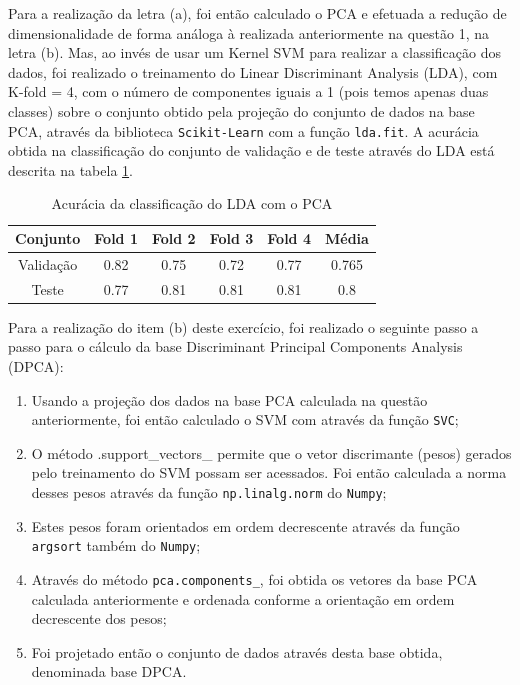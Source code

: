 \documentclass[]{abntex2}
\begin{document}
Para a realização da letra (a), foi então calculado o PCA e efetuada a redução de dimensionalidade de forma análoga à realizada anteriormente na questão 1, na letra (b). Mas, ao invés de usar um Kernel SVM para realizar a classificação dos dados, foi realizado o treinamento do Linear Discriminant Analysis (LDA), com K-fold = 4, com o número de componentes iguais a 1 (pois temos apenas duas classes) sobre o conjunto obtido pela projeção do conjunto de dados na base PCA, através da biblioteca \texttt{Scikit-Learn} com a função \texttt{lda.fit}. A acurácia obtida na classificação do conjunto de validação e de teste através do LDA está descrita na tabela \ref{tab:lda_clas}.

\begin{table}[H]
    \centering
    \begin{tabular}{|c|c|c|c|c|c|}
    \hline
    \rowcolor[HTML]{C0C0C0} 
    Conjunto                          & Fold 1 & Fold 2 & Fold 3 & Fold 4 & Média  \\ \hline
    \cellcolor[HTML]{C0C0C0}Validação & 0.82   & 0.75  & 0.72   & 0.77   & 0.765  \\ \hline
    \cellcolor[HTML]{C0C0C0}Teste     & 0.77   & 0.81   & 0.81   & 0.81   & 0.8 \\ \hline
    \end{tabular}
    \caption{Acurácia da classificação do LDA com o PCA}
    \label{tab:lda_clas}
\end{table}

Para a realização do item (b) deste exercício, foi realizado o seguinte passo a passo para o cálculo da base Discriminant Principal Components Analysis (DPCA):

\begin{enumerate}
    \item Usando a projeção dos dados na base PCA calculada na questão anteriormente, foi então calculado o SVM com através da função \texttt{SVC};
    \item O método {.support\_vectors\_} permite que o vetor discrimante (pesos) gerados pelo treinamento do SVM possam ser acessados. Foi então calculada a norma desses pesos através da função \texttt{np.linalg.norm} do \texttt{Numpy};
    \item Estes pesos foram orientados em ordem decrescente através da função \texttt{argsort} também do \texttt{Numpy};
    \item Através do método \texttt{pca.components\_}, foi obtida os vetores da base PCA calculada anteriormente e ordenada conforme a orientação em ordem decrescente dos pesos;
    \item Foi projetado então o conjunto de dados através desta base obtida, denominada base DPCA.   
\end{enumerate}
\end{document}
